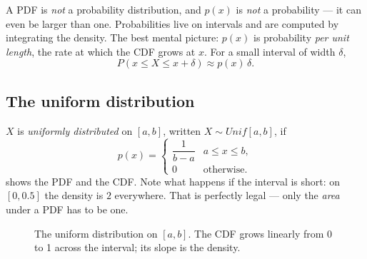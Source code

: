 \documentclass[11pt, oneside]{book}
\let\originalsubsection\subsection
\renewcommand{\subsection}{\Needspace{6\baselineskip}\originalsubsection}
\begin{document}
A PDF is \emph{not} a probability distribution, and $p(x)$ is \emph{not} a
probability --- it can even be larger than one. Probabilities live on
intervals and are computed by integrating the density. The best mental
picture: $p(x)$ is probability \emph{per unit length}, the rate at which the
CDF grows at $x$. For a small interval of width $\delta$,
\[
P(x \leq X \leq x + \delta) \approx p(x)\,\delta .
\]

\subsection{The uniform distribution}

$X$ is \emph{uniformly distributed} on $[a, b]$, written $X \sim
\mathit{Unif}[a, b]$, if
\[
p(x) = \begin{cases} \dfrac{1}{b - a} & a \leq x \leq b, \\[4pt]
                     0 & \text{otherwise.} \end{cases}
\]
 shows the PDF and the CDF. Note what happens if the
interval is short: on $[0, 0.5]$ the density is $2$ everywhere. That is
perfectly legal --- only the \emph{area} under a PDF has to be one.

\begin{figure}[htbp]
\centering
{}
\caption{The uniform distribution on $[a, b]$. The CDF grows linearly from 0 to
1 across the interval; its slope is the density.}
\label{fig:uniform}
\end{figure}
\end{document}
